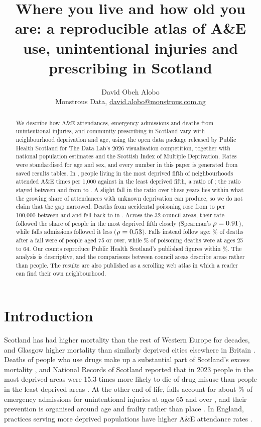 \documentclass[11pt,a4paper]{article}
\title{Where you live and how old you are: a reproducible atlas of A\&E use, unintentional
injuries and prescribing in Scotland}
\author{David Obeh Alobo\\[2pt]
  \small Monstrous Data, \href{mailto:david.alobo@monstrous.com.ng}{david.alobo@monstrous.com.ng}}
\date{}
\begin{document}
\maketitle

\begin{abstract}
\noindent
We describe how A\&E attendances, emergency admissions and deaths from unintentional injuries, and
community prescribing in Scotland vary with neighbourhood deprivation and age, using the open data
package released by Public Health Scotland for The Data Lab's 2026 visualisation competition,
together with national population estimates and the Scottish Index of Multiple Deprivation. Rates
were standardised for age and sex, and every number in this paper is generated from saved results
tables. In \aeLastYear{}, people living in the most deprived fifth of neighbourhoods attended A\&E
\aeQone{} times per 1{,}000 against \aeQfive{} in the least deprived fifth, a ratio of \aeRatio{};
the ratio stayed between \aeRatioMin{} and \aeRatioMax{} from \aeFirstYear{} to \aeLastYear{}. A
slight fall in the ratio over these years lies within what the growing share of attendances with
unknown deprivation can produce, so we do not claim that the gap narrowed. Deaths from accidental
poisoning rose from \poisonRateFirst{} to \poisonRatePeak{} per 100{,}000 between \trendFirst{} and
\poisonPeakYear{} and fell back to \poisonRateLast{} in \trendLast{}. Across the 32 council areas,
their rate followed the share of people in the most deprived fifth closely (Spearman's
$\rho = 0.91$), while falls admissions followed it less ($\rho = 0.53$). Falls instead
follow age: \fallsOldShare\% of deaths after a fall were of people aged 75 or over, while
\poisonMidShare\% of poisoning deaths were at ages 25 to 64. Our counts reproduce Public Health
Scotland's published figures within \valWorst\%. The analysis is descriptive, and the comparisons
between council areas describe areas rather than people. The results are also published as a
scrolling web atlas in which a reader can find their own neighbourhood.
\end{abstract}

\section{Introduction}

Scotland has had higher mortality than the rest of Western Europe for decades, and Glasgow higher
mortality than similarly deprived cities elsewhere in Britain \citep{walsh2017}. Deaths of people who
use drugs make up a substantial part of Scotland's excess mortality \citep{bloor2008},
and National Records of Scotland reported that in 2023 people in the most deprived areas were 15.3
times more likely to die of drug misuse than people in the least deprived areas
\citep{nrsdrugs2024}. At the other end of life, falls account for about \oldFallsShare\% of emergency
admissions for unintentional injuries at ages 65 and over \citep{phsinjuries2024}, and their
prevention is organised around age and frailty rather than place \citep{montero2022}.
In England, practices serving more deprived populations have higher A\&E attendance rates
\citep{scantlebury2015}.
\end{document}
